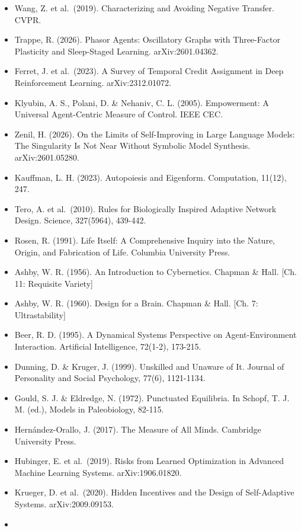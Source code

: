 \documentclass[
  11pt,
]{article}
\begin{document}
\begin{itemize}
\item
  Wang, Z. et al.~(2019). Characterizing and Avoiding Negative Transfer.
  CVPR.
\item
  Trappe, R. (2026). Phasor Agents: Oscillatory Graphs with Three-Factor
  Plasticity and Sleep-Staged Learning. arXiv:2601.04362.
\item
  Ferret, J. et al.~(2023). A Survey of Temporal Credit Assignment in
  Deep Reinforcement Learning. arXiv:2312.01072.
\item
  Klyubin, A. S., Polani, D. \& Nehaniv, C. L. (2005). Empowerment: A
  Universal Agent-Centric Measure of Control. IEEE CEC.
\item
  Zenil, H. (2026). On the Limits of Self-Improving in Large Language
  Models: The Singularity Is Not Near Without Symbolic Model Synthesis.
  arXiv:2601.05280.
\item
  Kauffman, L. H. (2023). Autopoiesis and Eigenform. Computation,
  11(12), 247.
\item
  Tero, A. et al.~(2010). Rules for Biologically Inspired Adaptive
  Network Design. Science, 327(5964), 439-442.
\item
  Rosen, R. (1991). Life Itself: A Comprehensive Inquiry into the
  Nature, Origin, and Fabrication of Life. Columbia University Press.
\item
  Ashby, W. R. (1956). An Introduction to Cybernetics. Chapman \& Hall.
  {[}Ch. 11: Requisite Variety{]}
\item
  Ashby, W. R. (1960). Design for a Brain. Chapman \& Hall. {[}Ch. 7:
  Ultrastability{]}
\item
  Beer, R. D. (1995). A Dynamical Systems Perspective on
  Agent-Environment Interaction. Artificial Intelligence, 72(1-2),
  173-215.
\item
  Dunning, D. \& Kruger, J. (1999). Unskilled and Unaware of It. Journal
  of Personality and Social Psychology, 77(6), 1121-1134.
\item
  Gould, S. J. \& Eldredge, N. (1972). Punctuated Equilibria. In Schopf,
  T. J. M. (ed.), Models in Paleobiology, 82-115.
\item
  Hernández-Orallo, J. (2017). The Measure of All Minds. Cambridge
  University Press.
\item
  Hubinger, E. et al.~(2019). Risks from Learned Optimization in
  Advanced Machine Learning Systems. arXiv:1906.01820.
\item
  Krueger, D. et al.~(2020). Hidden Incentives and the Design of
  Self-Adaptive Systems. arXiv:2009.09153.
\item

\end{itemize}
\end{document}
